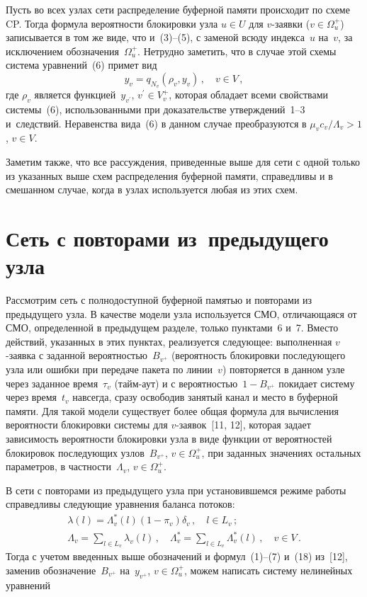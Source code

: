 \begin{multicols}{2}
     Пусть во всех узлах сети распределение буферной памяти происходит по 
схеме CP. Тогда формула вероятности блокировки узла $u\in U$ для $v$-заявки 
($v\in \Omega_u^+$) записывается в том же виде, что и~(3)--(5), с заменой 
всюду индекса~$u$ на~$v$, за исключением обозначения~$\Omega_u^+$. 
Нетрудно заметить, что в случае этой схемы система уравнений~(6) примет вид
     \begin{equation}
     y_v = q_{N_v}(\rho_v,y_v)\,,\quad v\in V\,,
     \end{equation}
     где $\rho_v$ является функцией~$y_{v^\prime}$, $v^\prime \in V_v^+$, 
которая обладает всеми свойствами системы~(6), использованными при 
доказательстве утверждений~1--3 и~след\-ст\-вий. Неравенства вида~(6) в 
данном случае преобразуются в $\mu_v c_v/\Lambda_v >1$, $v\in V$.
     
     Заметим также, что все рассуждения, приведенные выше для сети с одной 
только из указанных выше схем распределения буферной памяти, справедливы 
и в смешанном случае, когда в узлах используется любая из этих схем.
     
\section{Сеть с повторами из~предыдущего узла}
     
     Рассмотрим сеть с полнодоступной буферной памятью и повторами из 
предыдущего узла. В качестве модели узла используется СМО, отличающаяся 
от СМО, определенной в предыдущем разделе, только пунктами~6 и~7. Вместо 
действий, указанных в этих пунктах, реализуется следующее: выполненная 
     $v$-заявка с заданной вероятностью~$B_{v^+}$ (вероятность блокировки 
последующего узла или ошибки при передаче пакета по линии~$v$) 
повторяется в данном узле через заданное время~$\tau_v$ (тайм-аут) и с 
вероятностью~$1-B_{v^+}$ покидает систему через время~$t_v$ навсегда, 
сразу освободив занятый канал и место в буферной памяти. Для такой модели 
существует более общая формула для вычисления вероятности блокировки 
системы для $v$-заявок~[11, 12], которая задает зависимость вероятности 
блокировки узла в виде функции от вероятностей блокировок последующих 
узлов~$B_{v^+}$, $v\in \Omega_u^+$, при заданных значениях остальных 
параметров, в частности~$\Lambda_v$, $v\in\Omega_u^+$.
     
     В сети с повторами из предыдущего узла при установившемся режиме 
работы справедливы следующие уравнения баланса потоков:
     \begin{gather*}
     \lambda (l)  = \Lambda_v^*(l) (1-\pi_v)\delta_v\,,\quad l\in L_v\,;\\
     \Lambda_v  = \sum\limits_{l\in L_v} \lambda_v(l)\,,\quad 
\Lambda_v^*=\sum\limits_{l\in L_v} \Lambda_v^*(l)\,,\quad v\in V\,.
     \end{gather*}
Тогда с учетом введенных выше обозначений и формул~(1)--(7) и~(18) 
из~[12], заменив обозначение~$B_{v^+}$ на~$y_{v^+}$, $v\in\Omega_u^+$, 
можем написать систему нелинейных уравнений
\pagebreak


\end{multicols}
